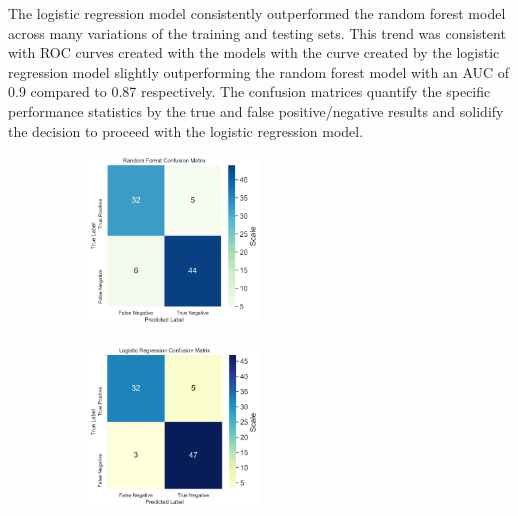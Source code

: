 \documentclass[12pt]{article}
\begin{document}
The logistic regression model consistently outperformed the random forest model across many variations of the training and testing sets. This trend was consistent with ROC curves created with the models with the curve created by the logistic regression model slightly outperforming the random forest model with an AUC of 0.9 compared to 0.87 respectively. The confusion matrices quantify the specific performance statistics by the true and false positive/negative results and solidify the decision to proceed with the logistic regression model.

\begin{center}
    \begin{figure}
        \begin{subfigure}{.8\textwidth}
            \centering
            \includegraphics[width=0.5\textwidth, height=0.6\textheight, keepaspectratio]{images/image6.png}
        \end{subfigure}
        \begin{subfigure}{.8\textwidth}
            \centering
            \includegraphics[width=0.5\textwidth, height=0.6\textheight, keepaspectratio]{images/image7.png}
        \end{subfigure}
    \end{figure}
\end{center}
\end{document}
